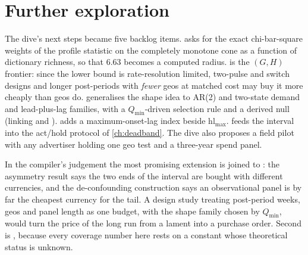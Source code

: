 \section{Further exploration}

The dive's next steps became five backlog items.  asks for the exact chi-bar-square weights of the profile statistic on the completely monotone cone as a function of dictionary richness, so that 6.63 becomes a computed radius.  is the $(G, H)$ frontier: since the lower bound is rate-resolution limited, two-pulse and switch designs and longer post-periods with \emph{fewer} geos at matched cost may buy it more cheaply than geos do.  generalises the shape idea to AR(2) and two-state demand and lead-plus-lag families, with a $Q_{\min}$-driven selection rule and a derived null (linking  and ).  adds a maximum-onset-lag index beside $\mathrm{hl}_{\max}$.  feeds the interval into the act/hold protocol of \cref{ch:deadband}. The dive also proposes a field pilot with any advertiser holding one geo test and a three-year spend panel.

In the compiler's judgement the most promising extension is  joined to : the asymmetry result says the two ends of the interval are bought with different currencies, and the de-confounding construction says an observational panel is by far the cheapest currency for the tail. A design study treating post-period weeks, geos and panel length as one budget, with the shape family chosen by $Q_{\min}$, would turn the price of the long run from a lament into a purchase order. Second is , because every coverage number here rests on a constant whose theoretical status is unknown.

